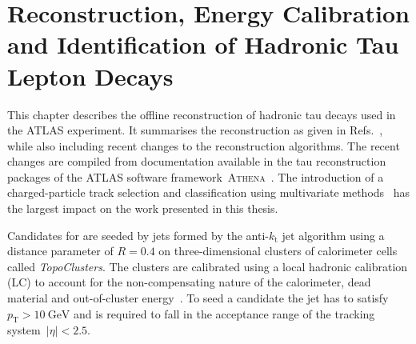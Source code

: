 \chapter{Reconstruction, Energy Calibration and
  Identification of Hadronic Tau Lepton Decays}
\label{sec:reconstruction}

%
%
This chapter describes the offline reconstruction of hadronic tau decays used in
the ATLAS experiment. It summarises the reconstruction as given in Refs.\
\cite{atlas:taurec:run1, atlas:taurec:run2}, while also including recent changes
to the reconstruction algorithms. The recent changes are compiled from
documentation available in the tau reconstruction packages of the ATLAS software
framework~\textsc{Athena}~\cite{athena}. The introduction of a charged-particle
track selection and classification using multivariate methods~\cite{duschinger}
has the largest impact on the work presented in this thesis.

Candidates for \tauhadvis are seeded by jets formed by the anti-$k_\mathrm{t}$
jet algorithm using a distance parameter of $R = 0.4$ on three-dimensional
clusters of calorimeter cells called \emph{TopoClusters}. The clusters are
calibrated using a local hadronic calibration (LC) to account for the
non-compensating nature of the calorimeter, dead material and out-of-cluster
energy~\cite{local_hadronic_calib}. To seed a \tauhadvis candidate the jet has
to satisfy~$p_\text{T} > \SI{10}{\GeV}$ and is required to fall in the
acceptance range of the tracking system~$|\eta| < \num{2.5}$.


